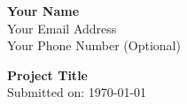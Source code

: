 \documentclass{letter}
\begin{document}
\begin{flushleft}
{\large \bfseries Your Name} \\
{\normalsize Your Email Address} \\
{\normalsize Your Phone Number (Optional)}
\end{flushleft}

\vspace{1cm}

\begin{center}
{\Large \bfseries Project Title} \\
\vspace{0.5cm}
{\normalsize Submitted on: \today}
\end{center}

\vspace{1.5cm}

\noindent %
\pagebreak
\end{document}
